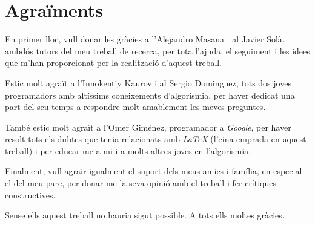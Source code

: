 \section{Agraïments}

En primer lloc, vull donar les gràcies a l'Alejandro Masana i al Javier Solà, ambdós tutors del meu treball de recerca, per tota l'ajuda, el seguiment i les idees que m'han proporcionat per la realització d'aquest treball. \newline

Estic molt agraït a l'Innokentiy Kaurov i al Sergio Dominguez, tots dos joves programadors amb altíssims coneixements d'algorísmia, per haver dedicat una part del seu temps a respondre molt amablement les meves preguntes. \newline

També estic molt agraït a l'Omer Giménez, programador a \emph{Google}, per haver resolt tots els dubtes que tenia relacionats amb \emph{LaTeX} (l'eina emprada en aquest treball) i per educar-me a mi i a molts altres joves en l'algorísmia. \newline

Finalment, vull agrair igualment el suport dels meus amics i família, en especial el del meu pare, per donar-me la seva opinió amb el treball i fer crítiques constructives. \newline

Sense ells aquest treball no hauria sigut possible. A tots ells moltes gràcies.

